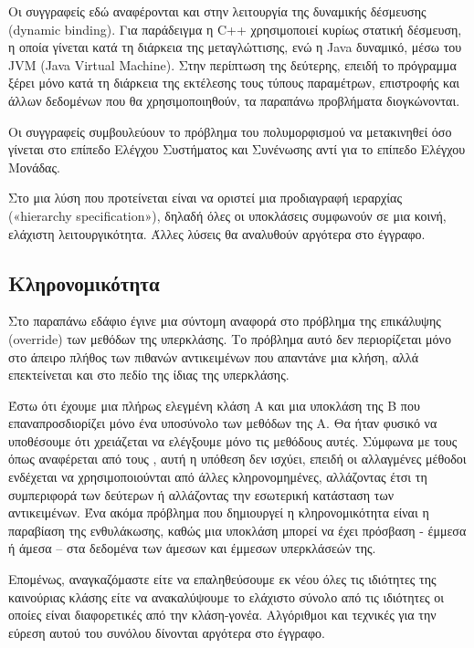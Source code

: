 \documentclass[12pt]{article}
\begin{document}
\par Οι συγγραφείς εδώ αναφέρονται και στην λειτουργία της δυναμικής δέσμευσης (dynamic binding). Για παράδειγμα η C++ χρησιμοποιεί κυρίως στατική δέσμευση, η οποία γίνεται κατά τη διάρκεια της μεταγλώττισης, ενώ η Java δυναμικό, μέσω του JVM (Java Virtual Machine). Στην περίπτωση της δεύτερης, επειδή το πρόγραμμα ξέρει μόνο κατά τη διάρκεια της εκτέλεσης τους τύπους παραμέτρων, επιστροφής και άλλων δεδομένων που θα χρησιμοποιηθούν, τα παραπάνω προβλήματα διογκώνονται.

\par Οι συγγραφείς συμβουλεύουν το πρόβλημα του πολυμορφισμού να μετακινηθεί όσο γίνεται στο επίπεδο Ελέγχου Συστήματος και Συνένωσης αντί για το επίπεδο Ελέγχου Μονάδας.

\par Στο \textcite{chandra} μια λύση που προτείνεται είναι να οριστεί μια προδιαγραφή ιεραρχίας («hierarchy specification»), δηλαδή όλες οι υποκλάσεις συμφωνούν σε μια κοινή, ελάχιστη λειτουργικότητα. Άλλες λύσεις θα αναλυθούν αργότερα στο έγγραφο.

\subsection{Κληρονομικότητα}

Στο παραπάνω εδάφιο έγινε μια σύντομη αναφορά στο πρόβλημα της επικάλυψης (override) των μεθόδων της υπερκλάσης. Το πρόβλημα αυτό δεν περιορίζεται μόνο στο άπειρο πλήθος των πιθανών αντικειμένων που απαντάνε μια κλήση, αλλά επεκτείνεται και στο πεδίο της ίδιας της υπερκλάσης.

\par Έστω ότι έχουμε μια πλήρως ελεγμένη κλάση Α και μια υποκλάση της Β που επαναπροσδιορίζει μόνο ένα υποσύνολο των μεθόδων της Α. Θα ήταν φυσικό να υποθέσουμε ότι χρειάζεται να ελέγξουμε μόνο τις μεθόδους αυτές. Σύμφωνα με τους \textcite{perry} όπως αναφέρεται από τους \textcite{barbey}, αυτή η υπόθεση δεν ισχύει, επειδή οι αλλαγμένες μέθοδοι ενδέχεται να χρησιμοποιούνται από άλλες κληρονομημένες, αλλάζοντας έτσι τη συμπεριφορά των δεύτερων ή αλλάζοντας την εσωτερική κατάσταση των αντικειμένων. Ένα ακόμα πρόβλημα που δημιουργεί η κληρονομικότητα είναι η παραβίαση της ενθυλάκωσης, καθώς μια υποκλάση μπορεί να έχει πρόσβαση - έμμεσα ή άμεσα – στα δεδομένα των άμεσων και έμμεσων υπερκλάσεών της. 

\par Επομένως, αναγκαζόμαστε είτε να επαληθεύσουμε εκ νέου όλες τις ιδιότητες της καινούριας κλάσης είτε να ανακαλύψουμε το ελάχιστο σύνολο από τις ιδιότητες οι οποίες είναι διαφορετικές από την κλάση-γονέα. Αλγόριθμοι και τεχνικές για την εύρεση αυτού του συνόλου δίνονται αργότερα στο έγγραφο.
\end{document}
